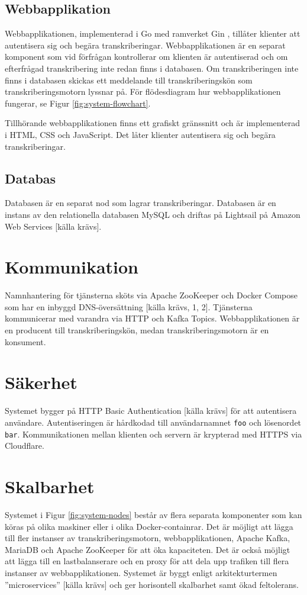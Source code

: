 \subsection{Webbapplikation}
\label{sec:web-application}
Webbapplikationen, implementerad i Go med ramverket Gin \cite{GinGonic},
tillåter klienter att autentisera sig och begära transkriberingar.
Webbapplikationen är en separat komponent som vid förfrågan kontrollerar om
klienten är autentiserad och om efterfrågad transkribering inte redan finns i
databasen. Om transkriberingen inte finns i databasen skickas ett meddelande
till transkriberingskön som transkriberingsmotorn lyssnar på. För
flödesdiagram hur webbapplikationen fungerar, se Figur
\ref{fig:system-flowchart}.

Tillhörande webbapplikationen finns ett grafiskt gränssnitt och är
implementerad i HTML, CSS och JavaScript. Det låter klienter autentisera sig
och begära transkriberingar. 

\subsection{Databas}
\label{sec:database}
Databasen är en separat nod som lagrar transkriberingar. Databasen är en
instans av den relationella databasen MySQL och driftas på Lightsail på Amazon
Web Services [källa krävs].

\section{Kommunikation}
\label{sec:communication}
Namnhantering för tjänsterna sköts via Apache ZooKeeper och
Docker Compose som har en inbyggd DNS-översättning [källa krävs, 1, 2].
Tjänsterna kommunicerar med varandra via HTTP och Kafka Topics.
Webbapplikationen är en producent till transkriberingskön, medan
transkriberingsmotorn är en konsument. 

\section{Säkerhet}
\label{sec:security}
Systemet bygger på HTTP Basic Authentication [källa krävs] för att autentisera
användare. Autentiseringen är hårdkodad till användarnamnet \verb|foo| och
lösenordet \verb|bar|. Kommunikationen mellan klienten och servern är
krypterad med HTTPS via Cloudflare.

\section{Skalbarhet}
\label{sec:scalability}
Systemet i Figur \ref{fig:system-nodes} består av flera separata komponenter
som kan köras på olika maskiner eller i olika Docker-containrar. Det är möjligt
att lägga till fler instanser av transkriberingsmotorn, webbapplikationen,
Apache Kafka, MariaDB och Apache ZooKeeper för att öka kapaciteten. Det är
också möjligt att lägga till en lastbalanserare och en proxy för att dela upp
trafiken till flera instanser av webbapplikationen. Systemet är byggt enligt
arkitekturtermen ''microservices'' [källa krävs] och ger horisontell
skalbarhet samt ökad feltolerans.
